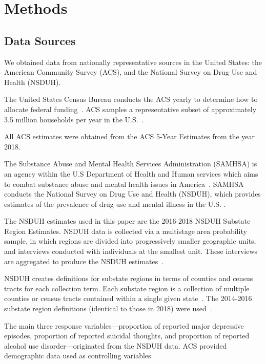 \documentclass{article}
\begin{document}
\section{Methods}

\subsection{Data Sources}

We obtained data from nationally representative sources
in the United States:
the American Community Survey (ACS), and
the National Survey on Drug Use and Health (NSDUH).

The United States Census Bureau
conducts the ACS yearly
to determine how to allocate federal
funding~\cite{acs_description}.
ACS samples a representative subset of
approximately 3.5 million households per year
in the U.S.~\cite{acs_sampling}.


All ACS estimates were obtained from
the ACS 5-Year Estimates from the year 2018.

The Substance Abuse and Mental Health Services Administration
(SAMHSA)
is an agency within
the U.S Department of Health and Human services which
aims to combat substance abuse and mental health
issues in America~\cite{samhsa_about_us}.
SAMHSA conducts
the National Survey on Drug Use and Health (NSDUH),
which provides
estimates of the prevalence of drug use and mental illness
in the U.S.
\cite{samhsa_data}.

The NSDUH estimates used in this paper are the
2016-2018 NSDUH Substate Region Estimates.
NSDUH data is collected via a multistage area probability sample,
in which regions are divided
into progressively smaller geographic units,
and interviews conducted with individuals at the smallest unit.
These interviews are aggregated to produce the NSDUH
estimates~\cite{nsduh_description}.

NSDUH creates definitions for substate regions in terms of
counties and census tracts for each collection term.
Each substate region is a collection of multiple
counties or census tracts contained within a single
given state~\cite{samhsa_substate_region_defs}.
The 2014-2016 substate region definitions
(identical to those in 2018)
were used~\cite{samhsa_substate_region_defs}.

The main three response
variables---proportion of reported major depressive episodes,
proportion of reported suicidal thoughts,
and proportion of reported alcohol use disorder---originated
from the NSDUH data.
ACS provided demographic data used as controlling variables.
\end{document}
